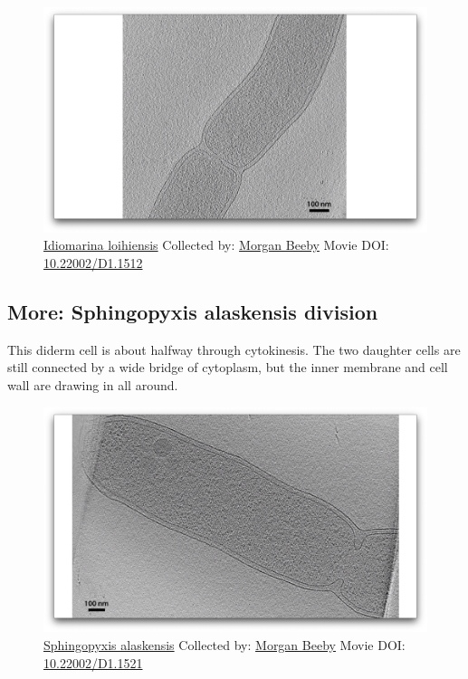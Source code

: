 \documentclass[]{tufte-book}
\begin{document}
\begin{figure}
\includegraphics{movie_stills/5_6} \caption[\protect\hyperlink{tree}{Idiomarina loihiensis} Collected by:
\protect\hyperlink{morgan_beeby}{Morgan Beeby} Movie DOI:
\href{https://doi.org/10.22002/D1.1512}{10.22002/D1.1512}]{\protect\hyperlink{tree}{Idiomarina loihiensis} Collected by:
\protect\hyperlink{morgan_beeby}{Morgan Beeby} Movie DOI:
\href{https://doi.org/10.22002/D1.1512}{10.22002/D1.1512}}\label{fig:5-6}
\end{figure}

\hypertarget{Sphingopyxis_alaskensis_division}{\subsection*{More:
Sphingopyxis alaskensis
division}\label{Sphingopyxis_alaskensis_division}}

This diderm cell is about halfway through cytokinesis. The two daughter
cells are still connected by a wide bridge of cytoplasm, but the inner
membrane and cell wall are drawing in all around.





\begin{figure}
\includegraphics{movie_stills/5_6a} \caption[\protect\hyperlink{tree}{Sphingopyxis alaskensis} Collected
by: \protect\hyperlink{morgan_beeby}{Morgan Beeby} Movie DOI:
\href{https://doi.org/10.22002/D1.1521}{10.22002/D1.1521}]{\protect\hyperlink{tree}{Sphingopyxis alaskensis} Collected
by: \protect\hyperlink{morgan_beeby}{Morgan Beeby} Movie DOI:
\href{https://doi.org/10.22002/D1.1521}{10.22002/D1.1521}}\label{fig:5-6a}
\end{figure}
\end{document}
